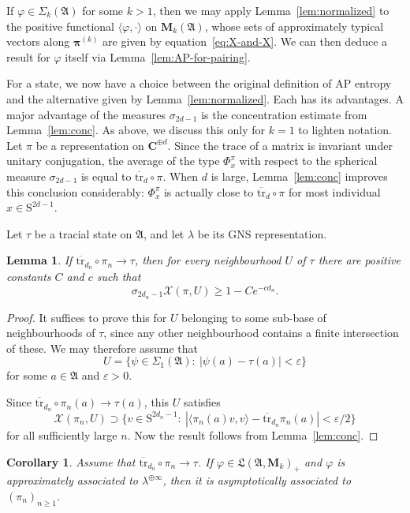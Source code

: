 \documentclass[12pt,a4paper]{article}
\numberwithin{equation}{section}
\newtheorem{lem}[thm]{Lemma}
\newtheorem{cor}[thm]{Corollary}
\theoremstyle{remark}
\newcommand{\bbC}{\mathbf{C}}
\newcommand{\rmS}{\mathrm{S}}
\newcommand{\rmM}{\mathbf{M}}
\newcommand{\X}{\mathcal{X}}
\newcommand{\A}{\mathfrak{A}}
\newcommand{\frL}{\mathfrak{L}}
\renewcommand{\S}{\Sigma}
\newcommand{\eps}{\varepsilon}
\renewcommand{\phi}{\varphi}
\renewcommand{\l}{\lambda}
\newcommand{\s}{\sigma}
\newcommand{\bspi}{\boldsymbol{\pi}}
\newcommand{\tr}{\overline{\mathrm{tr}}}
\begin{document}
If $\phi \in \S_k(\A)$ for some $k > 1$, then we may apply Lemma~\ref{lem:normalized} to the positive functional $\langle \phi,\cdot\rangle$ on $\rmM_k(\A)$, whose sets of approximately typical vectors along $\bspi^{(k)}$ are given by equation~\eqref{eq:X-and-X}.  We can then deduce a result for $\phi$ itself via Lemma~\ref{lem:AP-for-pairing}.

For a state, we now have a choice between the original definition of AP entropy and the alternative given by Lemma~\ref{lem:normalized}.  Each has its advantages.  A major advantage of the measures $\s_{2d-1}$ is the concentration estimate from Lemma~\ref{lem:conc}.  As above, we discuss this only for $k=1$ to lighten notation.  Let $\pi$ be a representation on $\bbC^{\oplus d}$. Since the trace of a matrix is invariant under unitary conjugation, the average of the type $\Phi^\pi_x$ with respect to the spherical measure $\s_{2d-1}$ is equal to $\tr_d\circ \pi$.  When $d$ is large, Lemma~\ref{lem:conc} improves this conclusion considerably: $\Phi^\pi_x$ is actually close to $\tr_d\circ \pi$ for most individual $x \in \rmS^{2d-1}$.

Let $\tau$ be a tracial state on $\A$, and let $\l$ be its GNS representation.

\begin{lem}\label{lem:conc0}
If $\tr_{d_n}\circ \pi_n \to \tau$, then for every neighbourhood $U$ of $\tau$ there are positive constants $C$ and $c$ such that
	\[\s_{2d_n-1}\X(\pi,U) \ge 1 - Ce^{-cd_n}.\]
\end{lem}

\begin{proof}
It suffices to prove this for $U$ belonging to some sub-base of neighbourhoods of $\tau$, since any other neighbourhood contains a finite intersection of these.  We may therefore assume that
\[U = \{\psi\in \S_1(\A):\ |\psi(a) - \tau(a)| < \eps\}\]
for some $a \in \A$ and $\eps > 0$.

Since $\tr_{d_n}\circ \pi_n(a) \to \tau(a)$, this $U$ satisfies
\[\X(\pi_n,U) \supset  \{v \in \rmS^{2d_n-1}:\ |\langle \pi_n(a)v,v\rangle - \tr_{d_n}\pi_n(a)| < \eps/2\}\]
for all sufficiently large $n$. Now the result follows from Lemma~\ref{lem:conc}.
\end{proof}

\begin{cor}\label{cor:char-and-weak-global}
Assume that $\tr_{d_n}\circ \pi_n \to \tau$.  If $\phi \in\frL(\A,\rmM_k)_+$ and $\phi$ is approximately associated to $\l^{\oplus \infty}$, then it is asymptotically associated to $(\pi_n)_{n\ge 1}$.
\end{cor}
\end{document}
